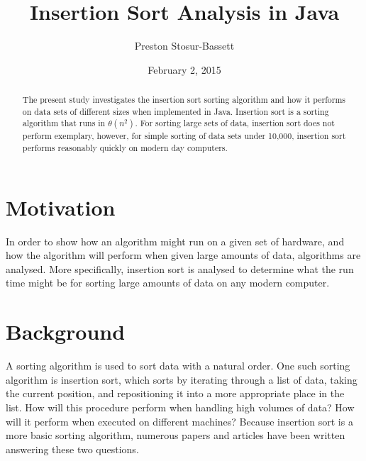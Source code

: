 \documentclass[onecolumn, 12pt, article]{IEEEtran}
\numberwithin{case}{problem}
\numberwithin{condition}{problem}
\numberwithin{condition}{subsection}
\numberwithin{definition}{section}
\theoremstyle{remark}
\numberwithin{question}{problem}
\theoremstyle{plain}
\numberwithin{answer}{problem}
\numberwithin{solution}{section}
\numberwithin{equation}{section}%
\begin{document}
\title{Insertion Sort Analysis in Java}
\author{Preston Stosur-Bassett}
\date{February 2, 2015}
\maketitle

\pagestyle{fancy}

\begin{abstract}
The present study investigates the insertion sort sorting algorithm and how it performs on data sets of different sizes when implemented in Java. Insertion sort is a sorting algorithm that runs in $ \theta(n^2) $. For sorting large sets of data, insertion sort does not perform exemplary, however, for simple sorting of data sets under 10,000, insertion sort performs reasonably quickly on modern day computers. 
\end{abstract}

\section{Motivation}
In order to show how an algorithm might run on a given set of hardware, and how the algorithm will perform when given large amounts of data, algorithms are analysed. More specifically, insertion sort is analysed to determine what the run time might be for sorting large amounts of data on any modern computer.

\section{Background}
A sorting algorithm is used to sort data with a natural order. One such sorting algorithm is insertion sort, which sorts by iterating through a list of data, taking the current position, and repositioning it into a more appropriate place in the list. How will this procedure perform when handling high volumes of data? How will it perform when executed on different machines? Because insertion sort is a more basic sorting algorithm, numerous papers and articles have been written answering these two questions.

\end{document}

